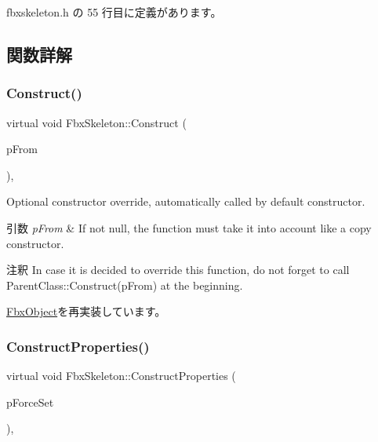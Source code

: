  fbxskeleton.\+h の 55 行目に定義があります。



\subsection{関数詳解}
\mbox{\label{class_fbx_skeleton_a76c2cdc12c50e753bf2510aa9c18c594}} 
\subsubsection{\texorpdfstring{Construct()}{Construct()}}
{\footnotesize\ttfamily virtual void Fbx\+Skeleton\+::\+Construct (\begin{DoxyParamCaption}\item[{const \hyperlink{class_fbx_object}{Fbx\+Object} $\ast$}]{p\+From }\end{DoxyParamCaption})\hspace{0.3cm}{\ttfamily [protected]}, {\ttfamily [virtual]}}

Optional constructor override, automatically called by default constructor. 
\begin{DoxyParams}{引数}
{\em p\+From} & If not null, the function must take it into account like a copy constructor. \\
\hline
\end{DoxyParams}
\begin{DoxyRemark}{注釈}
In case it is decided to override this function, do not forget to call Parent\+Class\+::\+Construct(p\+From) at the beginning. 
\end{DoxyRemark}


\hyperlink{class_fbx_object_a313503bc645af3fdceb4a99ef5cea7eb}{Fbx\+Object}を再実装しています。

\mbox{\label{class_fbx_skeleton_aa1e8d4dbe577415b4e00914ae75d46a0}} 
\subsubsection{\texorpdfstring{Construct\+Properties()}{ConstructProperties()}}
{\footnotesize\ttfamily virtual void Fbx\+Skeleton\+::\+Construct\+Properties (\begin{DoxyParamCaption}\item[{bool}]{p\+Force\+Set }\end{DoxyParamCaption})\hspace{0.3cm}{\ttfamily [protected]}, {\ttfamily [virtual]}}


